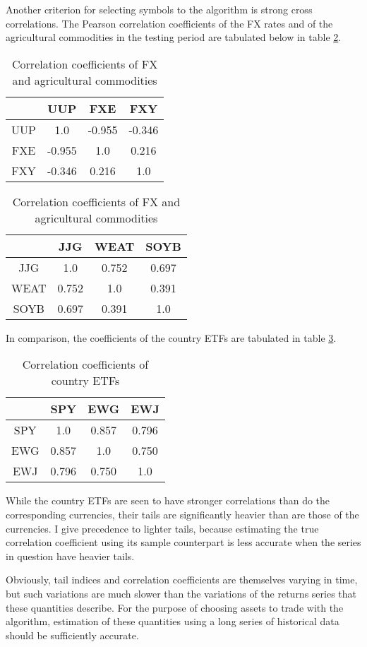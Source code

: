 \documentclass[12pt]{article}
\begin{document}
Another criterion for selecting symbols to the algorithm is strong
cross correlations. The Pearson correlation coefficients of the
FX rates and of the agricultural commodities in the testing period are
tabulated below in table \ref{tab:cor1}.
\begin{table}[htb!]
  \begin{minipage}[t]{0.5\linewidth}
    \centering
    \begin{tabular}{c|c|c|c}
      & UUP & FXE & FXY \\
      \hline
      UUP & 1.0 & -0.955 & -0.346 \\
      FXE & -0.955 & 1.0 & 0.216 \\
      FXY & -0.346 & 0.216 & 1.0
    \end{tabular}
  \end{minipage}\hfill
  \begin{minipage}[t]{0.5\linewidth}
    \centering
    \begin{tabular}{c|c|c|c}
      & JJG & WEAT & SOYB \\
      \hline
      JJG & 1.0 & 0.752 & 0.697 \\
      WEAT & 0.752 & 1.0 & 0.391 \\
      SOYB & 0.697 & 0.391 & 1.0
    \end{tabular}
  \end{minipage}
  \caption{Correlation coefficients of FX and agricultural commodities}
  \label{tab:cor1}
\end{table}
In comparison, the coefficients of the country ETFs are tabulated in
table \ref{tab:cor2}.
\begin{table}[htb!]
  \centering
  \begin{tabular}{c|c|c|c}
    & SPY & EWG & EWJ \\
    \hline
    SPY & 1.0 & 0.857 & 0.796 \\
    EWG & 0.857 & 1.0 & 0.750 \\
    EWJ & 0.796 & 0.750 & 1.0
  \end{tabular}
  \caption{Correlation coefficients of country ETFs}
  \label{tab:cor2}
\end{table}
While the country ETFs are seen to have stronger correlations than do
the corresponding currencies, their tails are significantly heavier
than are those of the currencies. I give precedence to lighter tails,
because estimating the true correlation coefficient using its sample
counterpart is less accurate when the series in question have heavier
tails.

Obviously, tail indices and correlation coefficients are themselves
varying in time, but such variations are much slower than the
variations of the returns series that these quantities describe. For
the purpose of choosing assets to trade with the algorithm, estimation
of these quantities using a long series of historical data should be
sufficiently accurate.



\end{document}
